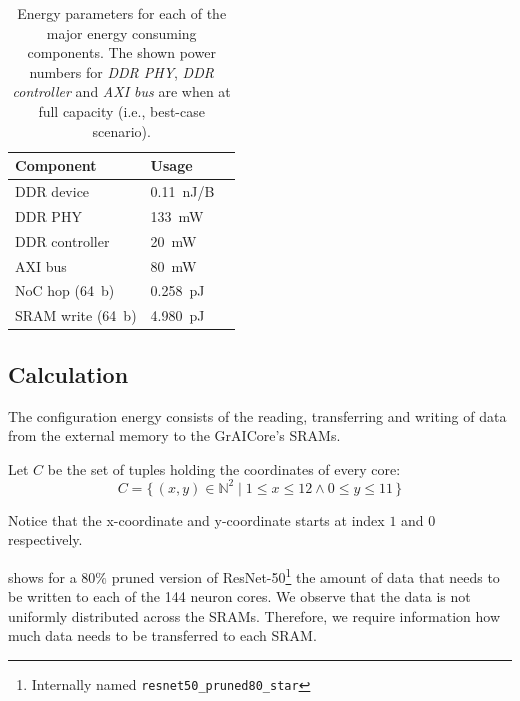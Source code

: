 \begin{table}[hbtp]
\centering
\begin{tabular}{@{}lll@{}}
\toprule
\textbf{Component}      & \textbf{Usage}  &  \\
\midrule
DDR device              & \SI{0.11}{nJ/B} &  \\
DDR PHY                 & \SI{133}{mW}    &  \\
DDR controller          & \SI{20}{mW}     &  \\
AXI bus                 & \SI{80}{mW}     &  \\
NoC hop (\SI{64}{b})    & \SI{0.258}{pJ}  &  \\
SRAM write (\SI{64}{b}) & \SI{4.980}{pJ}  &  \\
\bottomrule
\end{tabular}
\caption{Energy parameters for each of the major energy consuming components. The shown power numbers for \textit{DDR PHY}, \textit{DDR controller} and \textit{AXI bus} are when at full capacity (i.e., best-case scenario).}
\label{tab:energy_parameters_ddr}
\end{table}

\subsection{Calculation}
The configuration energy consists of the reading, transferring and writing of data from the external memory to the GrAICore's SRAMs. 

Let $C$ be the set of tuples holding the coordinates of every core:
\begin{equation*}
    C = \{\,\left(x,y\right) \in \mathbb{N}^2 \mid 1 \leq x \leq 12 \wedge 0 \leq y \leq 11 \,\} 
\end{equation*}

Notice that the x-coordinate and y-coordinate starts at index $1$ and $0$ respectively.

 shows for a $80\%$ pruned version of ResNet-50\footnote{Internally named \texttt{resnet50\_pruned80\_star}} the amount of data that needs to be written to each of the 144 neuron cores.
We observe that the data is not uniformly distributed across the SRAMs.
Therefore, we require information how much data needs to be transferred to each SRAM.

